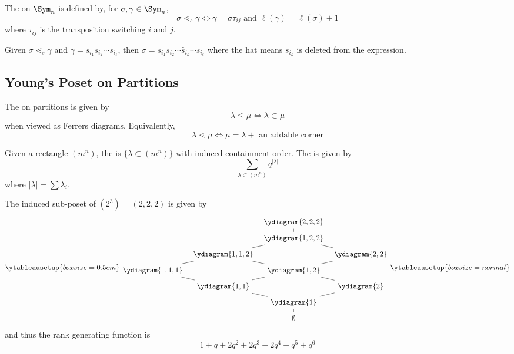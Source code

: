 \documentclass[11pt,leqno,oneside]{amsart}
\numberwithin{thm}{section}
\newcommand{\coveredby}{\mathrel{\lessdot}}
\begin{document}
\begin{defn}
  The  on \(\Sym_n\) is defined by, for
  \(\sigma, \gamma \in \Sym_n\), \[
    \sigma \coveredby_s \gamma \iff \gamma = \sigma \tau_{ij} \text{ and
    } \ell(\gamma) = \ell(\sigma)+1
  \]
  where \(\tau_{ij}\) is the transposition switching \(i\) and \(j\).
\end{defn}
\begin{thm}
  Given \(\sigma \coveredby_s \gamma\) and \(\gamma = s_{i_1} s_{i_2}
  \cdots s_{i_\ell}\), then \(\sigma = s_{i_1} s_{i_2} \cdots
  \hat{s}_{i_k} \cdots s_{i_\ell}\) where the hat means \(s_{i_k}\) is
  deleted from the expression.
\end{thm}
\subsection{Young's Poset on Partitions}
\begin{defn}
  The  on partitions is given by \[
    \lambda \leq \mu \iff \lambda \subset \mu
  \]
  when viewed as Ferrers diagrams. Equivalently, \[
    \lambda \coveredby \mu \iff \mu = \lambda + \text{ an addable corner}
  \]
\end{defn}
\begin{defn}
  Given a rectangle \((m^n)\), the  is \(\{\lambda \subset (m^n)\}\) with induced
  containment order.   The  is given
  by \[
    \sum_{\lambda \subset (m^n)} q^{|\lambda|}
  \]
  where \(|\lambda| = \sum \lambda_i\).
\end{defn}
\begin{example}
  The induced sub-poset of \((2^3) = (2,2,2)\) is given by \[
    \ytableausetup{boxsize=0.5em}
    \begin{tikzcd}[row sep=tiny, column sep=tiny]
      &&\ydiagram{2,2,2} \ar[d,dash]& \\
      &&\ydiagram{1,2,2} \ar[ld,dash] \ar[rd,dash]&\\
      &\ydiagram{1,1,2} \ar[ld,dash] \ar[rd,dash]&&\ydiagram{2,2} \ar[ld,dash]\\
      \ydiagram{1,1,1}\ar[rd, dash]&&\ydiagram{1,2} \ar[ld,dash]
      \ar[rd,dash]&\\
      &\ydiagram{1,1}\ar[rd,dash]&&\ydiagram{2}\ar[ld,dash]\\
      &&\ydiagram{1}\ar[d,dash]&\\
      &&\emptyset&
    \end{tikzcd}
    \ytableausetup{boxsize=normal}
  \]
  and thus the rank generating function is \[
    1+q+2q^2+2q^3+2q^4+q^5+q^6
  \]
\end{example}
\end{document}
